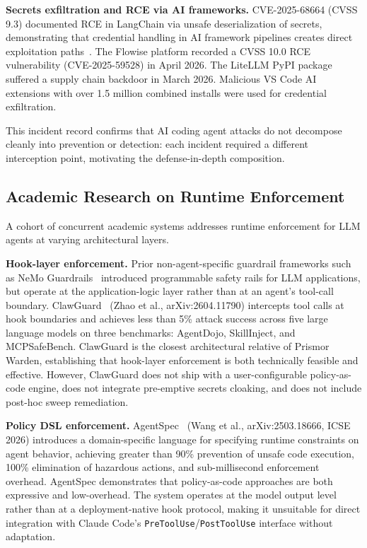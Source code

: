 \documentclass[11pt,letterpaper]{article}
\begin{document}
\textbf{Secrets exfiltration and RCE via AI frameworks.}
CVE-2025-68664 (CVSS 9.3) documented RCE in LangChain via unsafe deserialization
of secrets, demonstrating that credential handling in AI framework pipelines
creates direct exploitation paths~\cite{langchainrce2025}.
The Flowise platform recorded a CVSS 10.0 RCE vulnerability (CVE-2025-59528) in
April 2026.
The LiteLLM PyPI package suffered a supply chain backdoor in March 2026.
Malicious VS Code AI extensions with over 1.5 million combined installs were used
for credential exfiltration.

This incident record confirms that AI coding agent attacks do not decompose
cleanly into prevention or detection: each incident required a different
interception point, motivating the defense-in-depth composition.

\subsection{Academic Research on Runtime Enforcement}
\label{subsec:runtime}

A cohort of concurrent academic systems addresses runtime enforcement for LLM
agents at varying architectural layers.

\textbf{Hook-layer enforcement.}
Prior non-agent-specific guardrail frameworks such as NeMo Guardrails~\cite{rebedea2023nemo}
introduced programmable safety rails for LLM applications, but operate at the
application-logic layer rather than at an agent's tool-call boundary.
ClawGuard~\cite{zhao2026clawguard} (Zhao et al., arXiv:2604.11790) intercepts
tool calls at hook boundaries and achieves less than 5\% attack success across
five large language models on three benchmarks: AgentDojo, SkillInject, and
MCPSafeBench.
ClawGuard is the closest architectural relative of Prismor Warden, establishing
that hook-layer enforcement is both technically feasible and effective.
However, ClawGuard does not ship with a user-configurable policy-as-code engine,
does not integrate pre-emptive secrets cloaking, and does not include post-hoc
sweep remediation.

\textbf{Policy DSL enforcement.}
AgentSpec~\cite{wang2026agentspec} (Wang et al., arXiv:2503.18666, ICSE 2026)
introduces a domain-specific language for specifying runtime constraints on agent
behavior, achieving greater than 90\% prevention of unsafe code execution,
100\% elimination of hazardous actions, and sub-millisecond enforcement overhead.
AgentSpec demonstrates that policy-as-code approaches are both expressive and
low-overhead.
The system operates at the model output level rather than at a deployment-native
hook protocol, making it unsuitable for direct integration with Claude Code's
\texttt{PreToolUse}/\texttt{PostToolUse} interface without adaptation.
\end{document}
